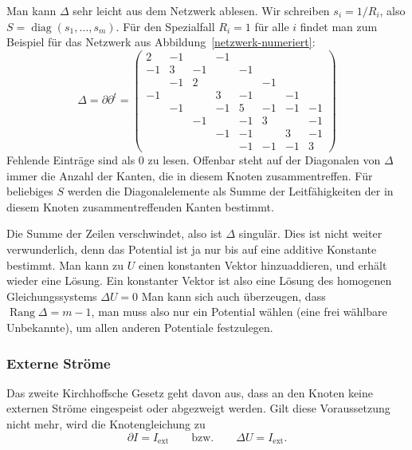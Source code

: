 Man kann $\Delta$ sehr leicht aus dem Netzwerk ablesen. Wir schreiben
$s_i=1/R_i$, also $S=\operatorname{diag}(s_1,\dots,s_m)$.
Für den Spezialfall
$R_i=1$ für alle $i$ findet man zum Beispiel für das Netzwerk
aus Abbildung~\ref{netzwerk-numeriert}:
\begin{equation}
\Delta
=
\partial \partial^t
=
\begin{pmatrix}
   2& -1&   & -1&   &   &   &   \\
  -1&  3& -1&   & -1&   &   &   \\
    & -1&  2&   &   & -1&   &   \\
  -1&   &   &  3& -1&   & -1&   \\
    & -1&   & -1&  5& -1& -1& -1\\
    &   & -1&   & -1&  3&   & -1\\
    &   &   & -1& -1&   &  3& -1\\
    &   &   &   & -1& -1& -1&  3
\end{pmatrix}
\label{samplelaplace}
\end{equation}
Fehlende Einträge sind als 0 zu lesen. Offenbar steht auf der Diagonalen
von $\Delta$ immer die Anzahl der Kanten, die in diesem 
Knoten zusammentreffen. Für beliebiges $S$ werden die Diagonalelemente
als Summe der Leitfähigkeiten der in diesem Knoten zusammentreffenden
Kanten bestimmt.

Die Summe der Zeilen verschwindet, also ist $\Delta$ singulär.
Dies ist nicht weiter verwunderlich, denn das Potential ist ja nur
bis auf eine additive Konstante bestimmt. Man kann zu $U$ einen
konstanten Vektor hinzuaddieren, und erhält wieder eine Lösung.
Ein konstanter Vektor ist also eine Lösung des homogenen 
Gleichungssystems $\Delta U=0$
Man kann sich auch überzeugen, dass $\operatorname{Rang}\Delta = m-1$,
man muss also nur ein Potential wählen (eine frei wählbare Unbekannte),
um allen anderen Potentiale festzulegen.

\subsubsection{Externe Ströme}
Das zweite Kirchhoffsche Gesetz geht davon aus, dass an den
Knoten keine externen Ströme eingespeist oder abgezweigt werden.
Gilt diese Voraussetzung nicht mehr, wird die Knotengleichung zu
\begin{equation}
\partial I=I_{\text{ext}}
\qquad
\text{bzw.}
\qquad
\Delta U=I_{\text{ext}}.
\label{externestroeme}
\end{equation}

